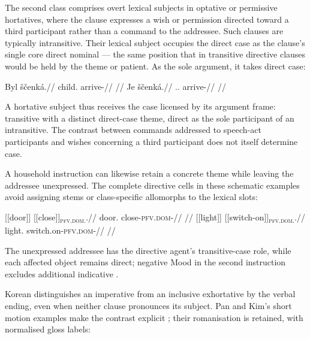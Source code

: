 The second class comprises overt lexical subjects in optative or permissive
hortatives, where the clause expresses a wish or permission directed toward a
third participant rather than a command to the addressee. Such clauses are
typically intransitive. Their lexical subject occupies the direct case as the
clause's single core direct nominal --- the same position that in transitive
directive clauses would be held by the theme or patient. As the sole argument, it takes
direct case:

\pex
\a
\begingl
\gla Byl ščenká.//
\glb child.\Dir{} arrive-\Hort{}//
\glft {} //
\endgl
\a
\begingl
\gla Je ščenká.//
\glb \Dem{}.\Dist{}.\Dir{} arrive-\Hort{}//
\glft {} //
\endgl
\xe

\noindent A hortative subject thus receives the case licensed by its argument
frame: transitive with a distinct direct-case theme, direct as the sole
participant of an intransitive. The contrast between commands addressed to
speech-act participants and wishes concerning a third participant does not
itself determine case.

A household instruction can likewise retain a concrete theme while leaving
the addressee unexpressed. The complete directive cells in these schematic
examples avoid assigning stems or class-specific allomorphs to the lexical
slots:

\pex\label{ex:directive-slot-workshop}
\a
\begingl
\gla \textnormal{[[door]]}\textsubscript{\Dir{}} \textnormal{[[close]]}\textsubscript{\textsc{pfv.dom}.\Imp{}}.//
\glb door.\Dir{} close-\textsc{pfv.dom}-\Imp{}//
\glft {}
//
\endgl
\a
\begingl
\gla \textnormal{[[light]]}\textsubscript{\Dir{}} \textnormal{[[switch-on]]}\textsubscript{\textsc{pfv.dom}.\Proh{}}.//
\glb light.\Dir{} switch.on-\textsc{pfv.dom}-\Proh{}//
\glft {}
//
\endgl
\xe

The unexpressed addressee has the directive agent's transitive-case role,
while each affected object remains direct; negative Mood in the second
instruction excludes additional indicative .

Korean distinguishes an imperative from an inclusive exhortative by the
verbal ending, even when neither clause pronounces its subject. Pan and Kim's
short motion examples make the contrast explicit
\cite[§2.1, examples~3b--c]{pankim2026particles}; their romanisation is
retained, with normalised gloss labels:

